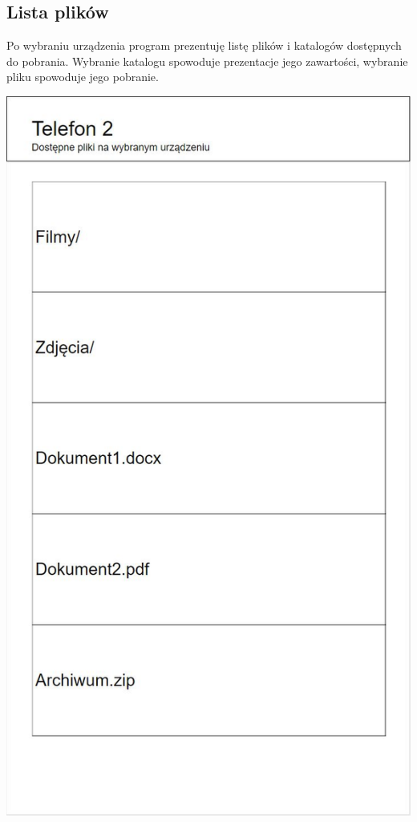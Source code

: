 \documentclass[12pt,a4paper]{article}
\begin{document}
\subsection{Lista plików}
Po wybraniu urządzenia program prezentuję listę plików i katalogów dostępnych do pobrania. Wybranie katalogu spowoduje prezentacje jego zawartości, wybranie pliku spowoduje jego pobranie.
\begin{center}
\includegraphics[scale=0.6]{2.JPG}
\end{center}
\end{document}

